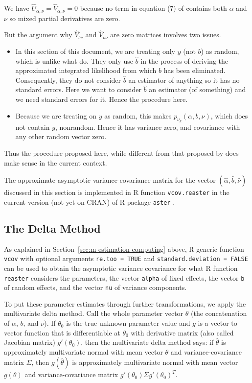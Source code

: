 \documentclass[11pt]{article}
\let\code=\texttt
\begin{document}
We have $\widehat{U}_{\alpha, \nu} = \widehat{V}_{\alpha, \nu} = 0$
because no term in equation (7) of \citet{reaster} contains both $\alpha$
and $\nu$ so mixed partial derivatives are zero.

But the argument why $\widehat{V}_{b \nu}$ and $\widehat{V}_{\nu \nu}$
are zero matrices involves two issues.
\begin{itemize}
\item In this section of this document, we are treating only $y$ (not $b$)
    as random, which is unlike what \citet{reaster} do.  They only use
    $\hat{b}$ in the process of deriving the approximated integrated
    likelihood from which $b$ has been eliminated.  Consequently, they
    do not consider $\hat{b}$ an estimator of anything so it has no
    standard errors.  Here we want to consider $\hat{b}$ an estimator
    (of something) and we need standard errors for it.  Hence the
    procedure here.
\item Because we are treating on $y$ as random, this makes
   $p_{\nu_k}(\alpha, b, \nu)$, which does not contain $y$, nonrandom.
   Hence it has variance zero, and covariance with any other random vector
   zero.
\end{itemize}

Thus the procedure proposed here, while different from that proposed
by \citet{reaster} does make sense in the current context.

The approximate asymptotic variance-covariance matrix for the vector
$(\hat{\alpha}, \hat{b}, \hat{\nu})$ discussed in this section is
implemented in R function \code{vcov.reaster} in
the current version (not yet on CRAN) of R package \code{aster}
\citep{aster-package}.

\subsection{The Delta Method}

As explained in Section~\ref{sec:m-estimation-computing} above,
R generic function \code{vcov} with optional arguments
\code{re.too = TRUE} and \code{standard.deviation = FALSE} can
be used to obtain the asymptotic variance covariance for what R
function \code{reaster} considers the parameters, the vector \code{alpha}
of fixed effects, the vector \code{b} of random effects, and the vector
\code{nu} of variance components.

To put these parameter estimates through further transformations, we
apply the multivariate delta method.  Call the whole parameter vector
$\theta$ (the concatenation of $\alpha$, $b$, and $\nu$).  If $\theta_0$
is the true unknown parameter value and $g$ is a vector-to-vector
function that is differentiable at $\theta_0$ with derivative matrix
(also called Jacobian matrix) $g'(\theta_0)$, then the multivariate delta
method says: if $\hat{\theta}$ is approximately multivariate normal
with mean vector $\theta$ and variance-covariance matrix $\Sigma$,
then $g(\hat{\theta})$ is approximately multivariate normal
with mean vector $g(\theta)$ and variance-covariance matrix
$g'(\theta_0) \Sigma g'(\theta_0)^T$.
\end{document}
